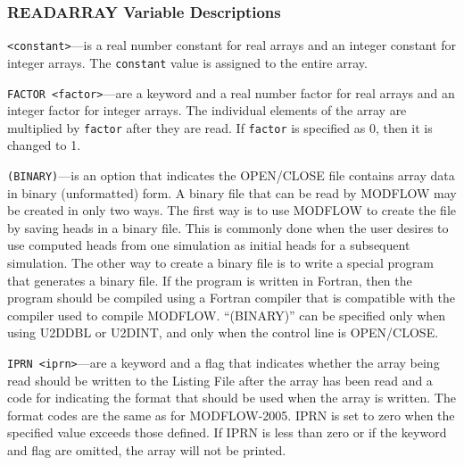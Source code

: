 \subsubsection{READARRAY Variable Descriptions}

\begin{description}

\item \texttt{<constant>}---is a real number constant for real arrays and an integer constant for integer arrays. The \texttt{constant} value is assigned to the entire array. 

\item \texttt{FACTOR <factor>}---are a keyword and a real number factor for real arrays and an integer factor for integer arrays. The individual elements of the array are multiplied by \texttt{factor} after they are read. If \texttt{factor} is specified as 0, then it is changed to 1.

\item \texttt{(BINARY)}---is an option that indicates the OPEN/CLOSE file contains array data in binary (unformatted) form. A binary file that can be read by MODFLOW may be created in only two ways. The first way is to use MODFLOW to create the file by saving heads in a binary file. This is commonly done when the user desires to use computed heads from one simulation as initial heads for a subsequent simulation. The other way to create a binary file is to write a special program that generates a binary file.  If the program is written in Fortran, then the program should be compiled using a Fortran compiler that is compatible with the compiler used to compile MODFLOW. ``(BINARY)'' can be specified only when using U2DDBL or U2DINT, and only when the control line is OPEN/CLOSE.

\item \texttt{IPRN <iprn>}---are a keyword and a flag that indicates whether the array being read should be written to the Listing File after the array has been read and a code for indicating the format that should be used when the array is written. The format codes are the same as for MODFLOW-2005. IPRN is set to zero when the specified value exceeds those defined. If IPRN is less than zero or if the keyword and flag are omitted, the array will not be printed.

\end{description}

